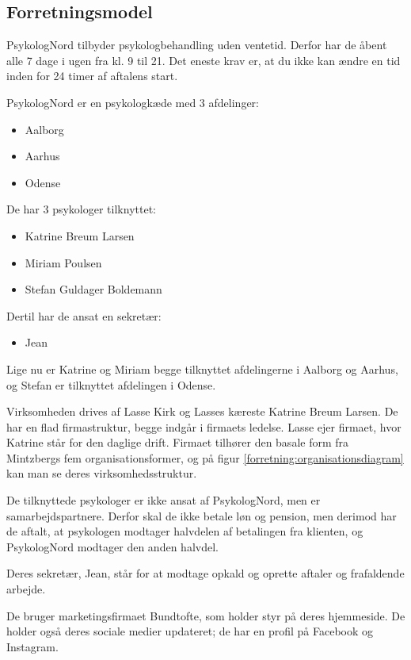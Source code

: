 \subsection{Forretningsmodel}
\label{section:forretningsmodel}

PsykologNord tilbyder psykologbehandling uden ventetid.
Derfor har de åbent alle 7 dage i ugen fra kl. 9 til 21. Det eneste krav er, at du ikke kan ændre en tid inden for 24 timer af aftalens start.

PsykologNord er en psykologkæde med 3 afdelinger:
\begin{itemize}
    \item Aalborg
    \item Aarhus
    \item Odense
\end{itemize}

De har 3 psykologer tilknyttet:

\begin{itemize}
    \item Katrine Breum Larsen
    \item Miriam Poulsen
    \item Stefan Guldager Boldemann
\end{itemize}

Dertil har de ansat en sekretær:

\begin{itemize}
	\item Jean
\end{itemize}

Lige nu er Katrine og Miriam begge tilknyttet afdelingerne i Aalborg og Aarhus, og Stefan er tilknyttet afdelingen i Odense.


Virksomheden drives af Lasse Kirk og Lasses kæreste Katrine Breum Larsen.
De har en flad firmastruktur, begge indgår i firmaets ledelse. Lasse ejer firmaet, hvor Katrine står for den daglige drift. 
Firmaet tilhører den basale form fra Mintzbergs fem organisationsformer, og på 
figur \ref{forretning:organisationsdiagram} kan man se deres virksomhedsstruktur.

De tilknyttede psykologer er ikke ansat af PsykologNord, men er samarbejdspartnere.
Derfor skal de ikke betale løn og pension, men derimod har de aftalt, at psykologen modtager halvdelen af betalingen fra klienten, og PsykologNord modtager den anden halvdel.

Deres sekretær, Jean, står for at modtage opkald og oprette aftaler og frafaldende arbejde.

De bruger marketingsfirmaet Bundtofte, som holder styr på deres hjemmeside. De holder også deres sociale medier updateret; de har en profil på Facebook og Instagram.

